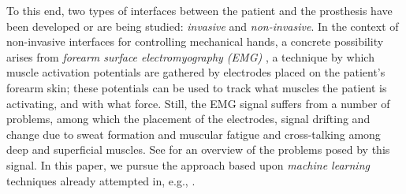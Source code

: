 To this end, two types of interfaces between the patient and the
prosthesis have been developed or are being studied:
\emph{invasive} and \emph{non-invasive}.
In the context of non-invasive interfaces for controlling mechanical
hands, a concrete possibility arises from \emph{forearm surface
electromyography (EMG)} \cite{zecca}, a technique by which muscle
activation potentials are gathered by electrodes placed on the
patient's forearm skin; these potentials can be used to track what
muscles the patient is activating, and with what force.  Still, the
EMG signal suffers from a number of problems, among which the
placement of the electrodes, signal drifting and change due to sweat
formation and muscular fatigue and cross-talking among deep and
superficial muscles. See \cite{deluca} for an overview of the problems
posed by this signal. In this paper, we pursue the approach based upon
\emph{machine learning} techniques already attempted in, e.g.,
\cite{dunlop,fukuda,smagt}.


